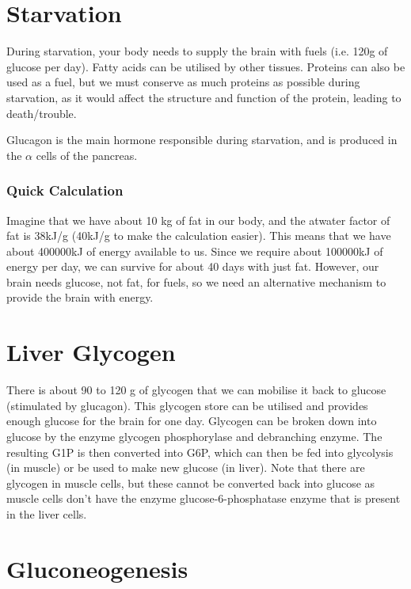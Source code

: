 \section{Starvation}

During starvation, your body needs to supply the brain with fuels (i.e. 120g of glucose per day).
Fatty acids can be utilised by other tissues.
Proteins can also be used as a fuel, but we must conserve as much proteins as possible during starvation, as it would affect the structure and function of the protein, leading to death/trouble.

Glucagon is the main hormone responsible during starvation, and is produced in the $\alpha$ cells of the pancreas.

\subsubsection*{Quick Calculation}

Imagine that we have about 10 kg of fat in our body, and the atwater factor of fat is 38kJ/g (40kJ/g to make the calculation easier).
This means that we have about 400000kJ of energy available to us.
Since we require about 100000kJ of energy per day, we can survive for about 40 days with just fat.
However, our brain needs glucose, not fat, for fuels, so we need an alternative mechanism to provide the brain with energy.

\section{Liver Glycogen}

There is about 90 to 120 g of glycogen that we can mobilise it back to glucose (stimulated by glucagon).
This glycogen store can be utilised and provides enough glucose for the brain for one day.
Glycogen can be broken down into glucose by the enzyme glycogen phosphorylase and debranching enzyme.
The resulting G1P is then converted into G6P, which can then be fed into glycolysis (in muscle) or be used to make new glucose (in liver).
Note that there are glycogen in muscle cells, but these cannot be converted back into glucose as muscle cells don't have the enzyme glucose-6-phosphatase enzyme that is present in the liver cells.

\begin{center}
\end{center}

\section{Gluconeogenesis}

